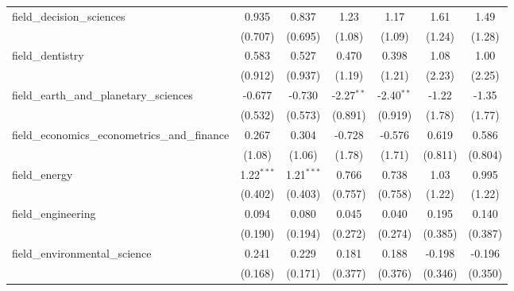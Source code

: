 \begin{tabular}{lcccccc}
   field\_decision\_sciences                                   & 0.935         & 0.837        & 1.23          & 1.17          & 1.61          & 1.49\\   
                                                               & (0.707)       & (0.695)      & (1.08)        & (1.09)        & (1.24)        & (1.28)\\   
   field\_dentistry                                            & 0.583         & 0.527        & 0.470         & 0.398         & 1.08          & 1.00\\   
                                                               & (0.912)       & (0.937)      & (1.19)        & (1.21)        & (2.23)        & (2.25)\\   
   field\_earth\_and\_planetary\_sciences                      & -0.677        & -0.730       & -2.27$^{**}$  & -2.40$^{**}$  & -1.22         & -1.35\\   
                                                               & (0.532)       & (0.573)      & (0.891)       & (0.919)       & (1.78)        & (1.77)\\   
   field\_economics\_econometrics\_and\_finance                & 0.267         & 0.304        & -0.728        & -0.576        & 0.619         & 0.586\\   
                                                               & (1.08)        & (1.06)       & (1.78)        & (1.71)        & (0.811)       & (0.804)\\   
   field\_energy                                               & 1.22$^{***}$  & 1.21$^{***}$ & 0.766         & 0.738         & 1.03          & 0.995\\   
                                                               & (0.402)       & (0.403)      & (0.757)       & (0.758)       & (1.22)        & (1.22)\\   
   field\_engineering                                          & 0.094         & 0.080        & 0.045         & 0.040         & 0.195         & 0.140\\   
                                                               & (0.190)       & (0.194)      & (0.272)       & (0.274)       & (0.385)       & (0.387)\\   
   field\_environmental\_science                               & 0.241         & 0.229        & 0.181         & 0.188         & -0.198        & -0.196\\   
                                                               & (0.168)       & (0.171)      & (0.377)       & (0.376)       & (0.346)       & (0.350)\\   

\end{tabular}
